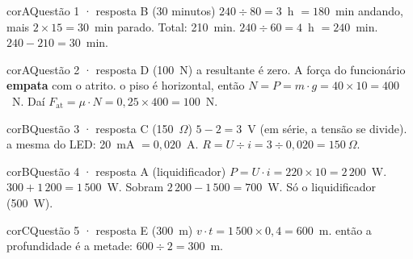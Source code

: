 \begin{comentario}{corA}{Questão 1 · resposta B (30 minutos)}
 $240 \div 80 = 3$~h $= 180$~min andando, mais $2 \times 15 = 30$~min parado. Total: 210~min.
 $240 \div 60 = 4$~h $= 240$~min.
 $240 - 210 = 30$~min.
\end{comentario}

\begin{comentario}{corA}{Questão 2 · resposta D (100~N)}
 a resultante é zero. A força do funcionário \textbf{empata} com o atrito.
 o piso é horizontal, então $N = P = m \cdot g = 40 \times 10 = 400$~N. Daí $F_{\text{at}} = \mu \cdot N = 0{,}25 \times 400 = 100$~N.
\end{comentario}

\begin{comentario}{corB}{Questão 3 · resposta C (150~$\Omega$)}
 $5 - 2 = 3$~V (em série, a tensão se divide).
 a mesma do LED: 20~mA $= 0{,}020$~A.
 $R = U \div i = 3 \div 0{,}020 = 150~\Omega$.
\end{comentario}

\begin{comentario}{corB}{Questão 4 · resposta A (liquidificador)}
 $P = U \cdot i = 220 \times 10 = 2\,200$~W.
 $300 + 1\,200 = 1\,500$~W. Sobram $2\,200 - 1\,500 = 700$~W.
 Só o liquidificador (500~W).
\end{comentario}

\begin{comentario}{corC}{Questão 5 · resposta E (300~m)}
 $v \cdot t = 1\,500 \times 0{,}4 = 600$~m.
 então a profundidade é a metade: $600 \div 2 = 300$~m.
\end{comentario}

